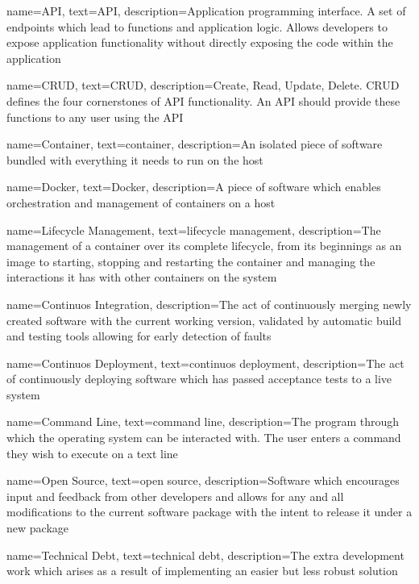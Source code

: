 {
    name={API},
    text={API},
    description={Application programming interface. A set of endpoints which lead to functions and application logic. Allows developers to expose application functionality without directly exposing the code within the application}
}

{
    name={CRUD},
    text={CRUD},
    description={Create, Read, Update, Delete. CRUD defines the four cornerstones of API functionality. An API should provide these functions to any user using the API}
}


{
    name={Container},
    text={container},
    description={An isolated piece of software bundled with everything it needs to run on the host}
}

{
		name={Docker},
    text={Docker},
		description={A piece of software which enables orchestration and management of containers on a host}
}

{
		name={Lifecycle Management},
    text={lifecycle management},
		description={The management of a container over its complete lifecycle, from its beginnings as an image to starting, stopping and restarting the container and managing the interactions it has with other containers on the system}
}

{
		name={Continuos Integration},
		description={The act of continuously merging newly created software with the current working version, validated by automatic build and testing tools allowing for early detection of faults}
}

{
		name={Continuos Deployment},
    text={continuos deployment},
		description={The act of continuously deploying software which has passed acceptance tests to a live system}
}

{
    name={Command Line},
    text={command line},
    description={The program through which the operating system can be interacted with. The user enters a command they wish to execute on a text line}
}

{
    name={Open Source},
    text={open source},
    description={Software which encourages input and feedback from other developers and allows for any and all modifications to the current software package with the intent to release it under a new package}
}

{
    name={Technical Debt},
    text={technical debt},
    description={The extra development work which arises as a result of implementing an easier but less robust solution}
}

